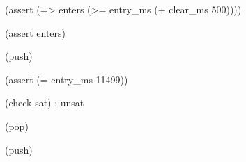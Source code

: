 \documentclass[11pt,a4paper]{article}
\begin{document}
\begin{minipage}{\linewidth}
{\begin{minipage}{\dimexpr\linewidth-2\fboxsep-2\fboxrule\relax}
\noindent{}\hspace{.8em}\parbox[t]{\dimexpr\linewidth-2.8em\relax}{\raggedright\ttfamily\fontsize{8.2}{10.5}\selectfont \hspace*{0.0em}(assert (=> enters (>= entry\_ms (+ clear\_ms 500))))\strut}\par\vspace{1pt}
\noindent{}\hspace{.8em}\parbox[t]{\dimexpr\linewidth-2.8em\relax}{\raggedright\ttfamily\fontsize{8.2}{10.5}\selectfont \hspace*{0.0em}(assert enters)\strut}\par\vspace{1pt}
\noindent{}\hspace{.8em}\parbox[t]{\dimexpr\linewidth-2.8em\relax}{\raggedright\ttfamily\fontsize{8.2}{10.5}\selectfont \hspace*{0.0em}(push)\strut}\par\vspace{1pt}
\noindent{}\hspace{.8em}\parbox[t]{\dimexpr\linewidth-2.8em\relax}{\raggedright\ttfamily\fontsize{8.2}{10.5}\selectfont \hspace*{0.0em}(assert (= entry\_ms 11499))\strut}\par\vspace{1pt}
\noindent{}\hspace{.8em}\parbox[t]{\dimexpr\linewidth-2.8em\relax}{\raggedright\ttfamily\fontsize{8.2}{10.5}\selectfont \hspace*{0.0em}(check-sat) ; unsat\strut}\par\vspace{1pt}
\noindent{}\hspace{.8em}\parbox[t]{\dimexpr\linewidth-2.8em\relax}{\raggedright\ttfamily\fontsize{8.2}{10.5}\selectfont \hspace*{0.0em}(pop)\strut}\par\vspace{1pt}
\noindent{}\hspace{.8em}\parbox[t]{\dimexpr\linewidth-2.8em\relax}{\raggedright\ttfamily\fontsize{8.2}{10.5}\selectfont \hspace*{0.0em}(push)\strut}\par\vspace{1pt}

\end{minipage}}
\end{minipage}
\end{document}
